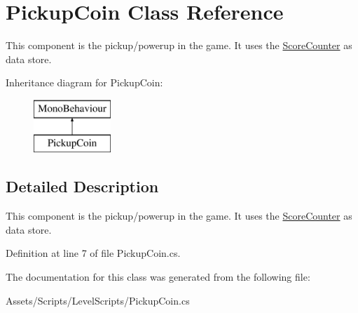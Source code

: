 \hypertarget{class_pickup_coin}{\section{Pickup\+Coin Class Reference}
\label{class_pickup_coin}
}


This component is the pickup/powerup in the game. It uses the \hyperlink{class_score_counter}{Score\+Counter} as data store.  


Inheritance diagram for Pickup\+Coin\+:\begin{figure}[H]
\begin{center}
\leavevmode
\includegraphics[height=2.000000cm]{class_pickup_coin}
\end{center}
\end{figure}


\subsection{Detailed Description}
This component is the pickup/powerup in the game. It uses the \hyperlink{class_score_counter}{Score\+Counter} as data store. 



Definition at line 7 of file Pickup\+Coin.\+cs.



The documentation for this class was generated from the following file\+:\begin{DoxyCompactItemize}
\item 
Assets/\+Scripts/\+Level\+Scripts/Pickup\+Coin.\+cs\end{DoxyCompactItemize}
